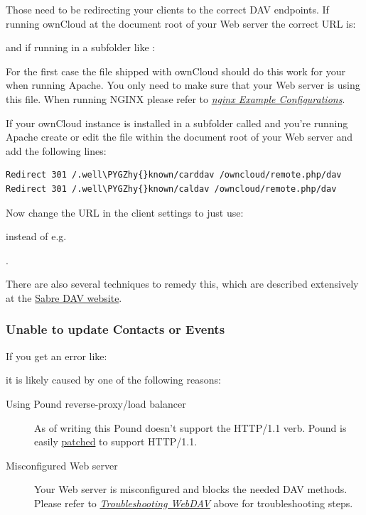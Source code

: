 \documentclass[letterpaper,10pt,english]{sphinxmanual}
\def\PYGZhy{\char`\-}
\begin{document}
Those need to be redirecting your clients to the correct DAV endpoints. If
running ownCloud at the document root of your Web server the correct URL is:


and if running in a subfolder like :


For the first case the  file shipped with ownCloud should do
this work for your when running Apache. You only need to make sure that your
Web server is using this file. When running NGINX please refer to
{\hyperref[installation/nginx_examples::doc]{\emph{nginx Example Configurations}}}.

If your ownCloud instance is installed in a subfolder called  and
you're running Apache create or edit the  file within the
document root of your Web server and add the following lines:

\begin{Verbatim}[commandchars=\\\{\}]
Redirect 301 /.well\PYGZhy{}known/carddav /owncloud/remote.php/dav
Redirect 301 /.well\PYGZhy{}known/caldav /owncloud/remote.php/dav
\end{Verbatim}

Now change the URL in the client settings to just use:


instead of e.g.

.

There are also several techniques to remedy this, which are described extensively at
the \href{http://sabre.io/dav/service-discovery/}{Sabre DAV website}.


\subsubsection{Unable to update Contacts or Events}
\label{issues/general_troubleshooting:unable-to-update-contacts-or-events}
If you get an error like:


it is likely caused by one of the following reasons:
\begin{description}
\item[{Using Pound reverse-proxy/load balancer}] \leavevmode
As of writing this Pound doesn't support the HTTP/1.1 verb.
Pound is easily \href{http://www.apsis.ch/pound/pound\_list/archive/2013/2013-08/1377264673000}{patched}
to support HTTP/1.1.

\item[{Misconfigured Web server}] \leavevmode
Your Web server is misconfigured and blocks the needed DAV methods.
Please refer to {\hyperref[issues/general_troubleshooting:trouble-webdav-label]{\emph{Troubleshooting WebDAV}}} above for troubleshooting steps.

\end{description}
\end{document}
